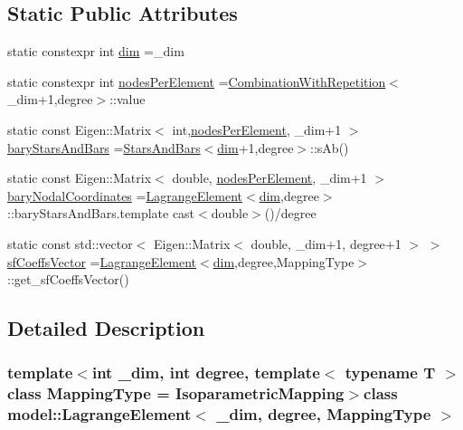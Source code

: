 \subsection*{Static Public Attributes}
\begin{DoxyCompactItemize}
\item 
static constexpr int \hyperlink{classmodel_1_1_lagrange_element_a56d161032b73c07c77326cfba73d731d}{dim} =\+\_\+dim
\item 
static constexpr int \hyperlink{classmodel_1_1_lagrange_element_a8f86452dcb9f1cc89fdbc0219c397d05}{nodes\+Per\+Element} =\hyperlink{structmodel_1_1_combination_with_repetition}{Combination\+With\+Repetition}$<$\+\_\+dim+1,degree$>$\+::value
\item 
static const Eigen\+::\+Matrix$<$ int,\hyperlink{classmodel_1_1_lagrange_element_a8f86452dcb9f1cc89fdbc0219c397d05}{nodes\+Per\+Element}, \+\_\+dim+1 $>$ \hyperlink{classmodel_1_1_lagrange_element_a99b14264b248306297ffb7b1ac87cf24}{bary\+Stars\+And\+Bars} =\hyperlink{structmodel_1_1_stars_and_bars}{Stars\+And\+Bars}$<$\hyperlink{classmodel_1_1_lagrange_element_a56d161032b73c07c77326cfba73d731d}{dim}+1,degree$>$\+::s\+Ab()
\item 
static const Eigen\+::\+Matrix$<$ double, \hyperlink{classmodel_1_1_lagrange_element_a8f86452dcb9f1cc89fdbc0219c397d05}{nodes\+Per\+Element}, \+\_\+dim+1 $>$ \hyperlink{classmodel_1_1_lagrange_element_a1477bef208a4816faa1416ebcce1f975}{bary\+Nodal\+Coordinates} =\hyperlink{classmodel_1_1_lagrange_element}{Lagrange\+Element}$<$\hyperlink{classmodel_1_1_lagrange_element_a56d161032b73c07c77326cfba73d731d}{dim},degree$>$\+::bary\+Stars\+And\+Bars.\+template cast$<$double$>$()/degree
\item 
static const std\+::vector$<$ Eigen\+::\+Matrix$<$ double, \+\_\+dim+1, degree+1 $>$ $>$ \hyperlink{classmodel_1_1_lagrange_element_a7f69e38490f0b6ab5c94835146a860f6}{sf\+Coeffs\+Vector} =\hyperlink{classmodel_1_1_lagrange_element}{Lagrange\+Element}$<$\hyperlink{classmodel_1_1_lagrange_element_a56d161032b73c07c77326cfba73d731d}{dim},degree,Mapping\+Type$>$\+::get\+\_\+sf\+Coeffs\+Vector()
\end{DoxyCompactItemize}


\subsection{Detailed Description}
\subsubsection*{template$<$int \+\_\+dim, int degree, template$<$ typename T $>$ class Mapping\+Type = Isoparametric\+Mapping$>$class model\+::\+Lagrange\+Element$<$ \+\_\+dim, degree, Mapping\+Type $>$}

